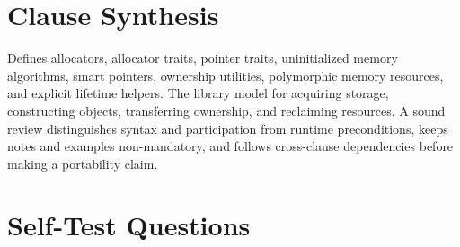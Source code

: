 \documentclass[11pt,letterpaper]{article}
\begin{document}
\section{Clause Synthesis}
\begin{CornellReferenceOrientationBox}Defines allocators, allocator traits, pointer traits, uninitialized memory algorithms, smart pointers, ownership utilities, polymorphic memory resources, and explicit lifetime helpers. The library model for acquiring storage, constructing objects, transferring ownership, and reclaiming resources. A sound review distinguishes syntax and participation from runtime preconditions, keeps notes and examples non-mandatory, and follows cross-clause dependencies before making a portability claim.\end{CornellReferenceOrientationBox}
\section{Self-Test Questions}
\end{document}
